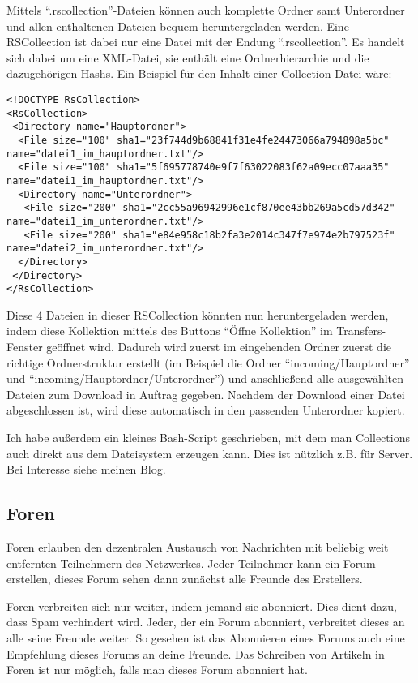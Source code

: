 Mittels ``.rscollection''-Dateien können auch komplette Ordner samt Unterordner und allen enthaltenen Dateien bequem heruntergeladen werden.
Eine RSCollection ist dabei nur eine Datei mit der Endung ``.rscollection''. Es handelt sich dabei um eine XML-Datei, sie enthält eine Ordnerhierarchie und die dazugehörigen Hashs. Ein Beispiel für den Inhalt einer Collection-Datei wäre:
\begin{lstlisting}
<!DOCTYPE RsCollection>
<RsCollection>
 <Directory name="Hauptordner">
  <File size="100" sha1="23f744d9b68841f31e4fe24473066a794898a5bc" name="datei1_im_hauptordner.txt"/>
  <File size="100" sha1="5f695778740e9f7f63022083f62a09ecc07aaa35" name="datei1_im_hauptordner.txt"/>
  <Directory name="Unterordner">
   <File size="200" sha1="2cc55a96942996e1cf870ee43bb269a5cd57d342" name="datei1_im_unterordner.txt"/>
   <File size="200" sha1="e84e958c18b2fa3e2014c347f7e974e2b797523f" name="datei2_im_unterordner.txt"/>
  </Directory>
 </Directory>
</RsCollection>
\end{lstlisting}
Diese 4 Dateien in dieser RSCollection könnten nun heruntergeladen werden, indem diese Kollektion mittels des Buttons ``Öffne Kollektion'' im Transfers-Fenster geöffnet wird.
Dadurch wird zuerst im eingehenden Ordner zuerst die richtige Ordnerstruktur erstellt (im Beispiel die Ordner ``incoming/Hauptordner'' und ``incoming/Hauptordner/Unterordner'') und anschließend alle ausgewählten Dateien zum Download in Auftrag gegeben.
Nachdem der Download einer Datei abgeschlossen ist, wird diese automatisch in den passenden Unterordner kopiert.

Ich habe außerdem ein kleines Bash-Script geschrieben, mit dem man Collections auch direkt aus dem Dateisystem erzeugen kann. Dies ist nützlich z.B. für Server. Bei Interesse siehe meinen Blog.

\subsection{Foren} \label{foren}

Foren erlauben den dezentralen Austausch von Nachrichten mit beliebig weit entfernten Teilnehmern des Netzwerkes. Jeder Teilnehmer kann ein Forum erstellen, dieses Forum sehen dann zunächst alle Freunde des Erstellers.

Foren verbreiten sich nur weiter, indem jemand sie abonniert. Dies dient dazu, dass Spam verhindert wird. Jeder, der ein Forum abonniert, verbreitet dieses an alle seine Freunde weiter. So gesehen ist das Abonnieren eines Forums auch eine Empfehlung dieses Forums an deine Freunde. Das Schreiben von Artikeln in Foren ist nur möglich, falls man dieses Forum abonniert hat.


